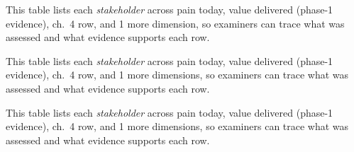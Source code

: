 \begin{table}[!htbp]

\centering\tablestripes\tablefontsize
{\small
{}

\noindent This table lists each \textit{stakeholder} across pain today, value delivered (phase-1 evidence), ch.~4 row, and 1 more dimension, so examiners can trace what was assessed and what evidence supports each row.



\noindent This table lists each \textit{stakeholder} across pain today, value delivered (phase-1 evidence), ch.~4 row, and 1 more dimensions, so examiners can trace what was assessed and what evidence supports each row.


\noindent This table lists each \textit{stakeholder} across pain today, value delivered (phase-1 evidence), ch.~4 row, and 1 more dimensions, so examiners can trace what was assessed and what evidence supports each row.



}
\end{table}
